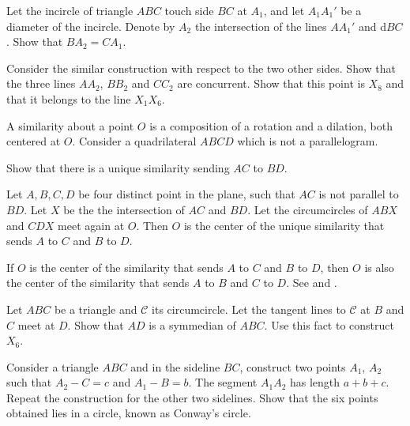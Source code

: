     \begin{exercise}
      Let the incircle of triangle $ABC$ touch side $ BC$ at $A_1$, and let $A_1 A_1'$ be a diameter of the incircle.
Denote by $A_2$ the intersection of the lines $AA_1'$  and d$BC$. Show that   $BA_2  = CA_1$.

Consider the similar construction with respect to the two other sides.
Show that the three lines $AA_2$, $BB_2$ and $CC_2$ are concurrent. Show that this point is  $X_8$ and that it belongs to the line $X_1X_6$. 


 \end{exercise}
 
 \begin{exercise}
 A    similarity    about a point $O$   is a composition of a
rotation and a dilation, both centered at $O$.
Consider a quadrilateral   $ABCD$  which is not a parallelogram.  

Show that there is a unique   similarity sending $AC$ to $BD$. 

Let $A, B, C, D$  be four distinct point in the plane, such that $AC$ is not parallel to $BD$. Let $X$ be the the intersection of
  $ AC$ and $BD$.  Let the circumcircles of $ABX $ and $CDX$ meet again at $O$. Then $O$  is the
center of the unique   similarity that sends $A $ to $C$ and $B $ to $D$.

If $O$ is the center of the   similarity that sends $A$ to $C$ and $B$ to $D$, then $O$ is also the center
of the   similarity that sends $A$ to $B$ and $C$ to $  D$.
See \cite{zhao-2021} and \cite{caliz2020-area-product}.
\end{exercise}

\begin{exercise}
Let $ABC$ be a triangle and $\mathcal{C}$  its circumcircle. Let the tangent lines to $\mathcal{C}$  at $B$ and $C$ meet at $D$.
Show that   $AD $ is  a symmedian of $ABC$.
 Use this fact to construct $X_6$.
\end{exercise}

\begin{exercise}
Consider a triangle $ABC$ and in the sideline $BC$, construct two points $A_1$, $A_2$ such that $A_2-C=c$ and $A_1-B=b$. The segment $A_1A_2$ has length $a+b+c$. Repeat the construction for the other two sidelines. Show that the six points obtained lies in a circle, known as Conway's circle.
\end{exercise}

